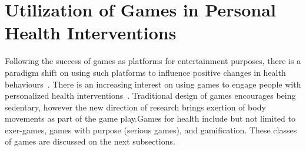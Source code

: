 \section{Utilization of Games in Personal Health Interventions}
Following the success of games as platforms for entertainment purposes, there is a paradigm shift on using such platforms to influence positive changes in health behaviours~\citep{king2013gamification}. There is an increasing interest on using games to engage people with personalized health interventions~\citep{mccallum2012gamification}. Traditional design of games encourages being sedentary, however the new direction of research brings exertion of body movements as part of the game play.Games for health include but not limited to exer-games, games with purpose (serious games), and gamification. These classes of games are discussed on the next subsections. 
